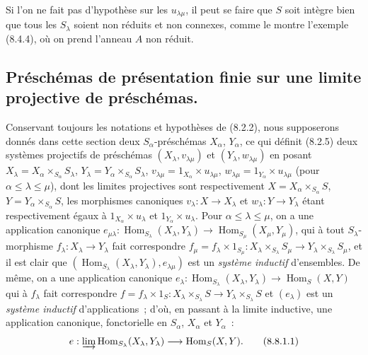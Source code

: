 \begin{remark}[8.7.4]
\label{IV.8.7.4-fr}
Si l'on ne fait pas d'hypothèse sur les $u_{\lambda\mu}$, il peut se faire que
$S$ soit intègre bien que tous les $S_\lambda$ soient non réduits et non
connexes, comme le montre l'exemple (8.4.4), où on prend l'anneau $A$ non
réduit.
\end{remark}

\subsection{Préschémas de présentation finie sur une limite projective de préschémas.}
\label{subsection:IV.8.8-fr}

\begin{env}[8.8.1]
\label{IV.8.8.1-fr}
Conservant toujours les notations et hypothèses de (8.2.2), nous supposerons
donnés dans cette section deux $S_\alpha$-préschémas $X_\alpha$, $Y_\alpha$,
ce qui définit (8.2.5) deux systèmes projectifs de préschémas
$(X_\lambda,v_{\lambda\mu})$ et $(Y_\lambda,w_{\lambda\mu})$ en posant
$X_\lambda=X_\alpha\times_{S_\alpha}S_\lambda$,
$Y_\lambda=Y_\alpha\times_{S_\alpha}S_\lambda$,
$v_{\lambda\mu}=1_{X_\alpha}\times u_{\lambda\mu}$,
$w_{\lambda\mu}=1_{Y_\alpha}\times u_{\lambda\mu}$ (pour
$\alpha\leq\lambda\leq\mu$), dont les limites projectives sont respectivement
$X=X_\alpha\times_{S_\alpha}S$, $Y=Y_\alpha\times_{S_\alpha}S$, les
morphismes canoniques $v_\lambda:X\to X_\lambda$ et
$w_\lambda:Y\to Y_\lambda$ étant respectivement égaux à
$1_{X_\alpha}\times u_\lambda$ et $1_{Y_\alpha}\times u_\lambda$. Pour
$\alpha\leq\lambda\leq\mu$, on a une application canonique
$e_{\mu\lambda}:\operatorname{Hom}_{S_\lambda}(X_\lambda,Y_\lambda)\to
\operatorname{Hom}_{S_\mu}(X_\mu,Y_\mu)$, qui à tout $S_\lambda$-morphisme
$f_\lambda:X_\lambda\to Y_\lambda$ fait correspondre
$f_\mu=f_\lambda\times1_{S_\mu}:X_\lambda\times_{S_\lambda}S_\mu\to
Y_\lambda\times_{S_\lambda}S_\mu$, et il est clair que
$(\operatorname{Hom}_{S_\lambda}(X_\lambda,Y_\lambda),e_{\lambda\mu})$ est un
\emph{système inductif} d'ensembles. De même, on a une application canonique
$e_\lambda:\operatorname{Hom}_{S_\lambda}(X_\lambda,Y_\lambda)\to
\operatorname{Hom}_S(X,Y)$ qui à $f_\lambda$ fait correspondre
$f=f_\lambda\times1_S:X_\lambda\times_{S_\lambda}S\to
Y_\lambda\times_{S_\lambda}S$ et $(e_\lambda)$ est un \emph{système inductif}
d'applications~; d'où, en passant à la limite inductive, une application
canonique, fonctorielle en $S_\alpha$, $X_\alpha$ et $Y_\alpha$~:
\begin{equation}
e:\varinjlim\operatorname{Hom}_{S_\lambda}(X_\lambda,Y_\lambda)
\longrightarrow\operatorname{Hom}_S(X,Y).
\tag{8.8.1.1}\label{IV.8.8.1.1-fr}
\end{equation}
\end{env}

